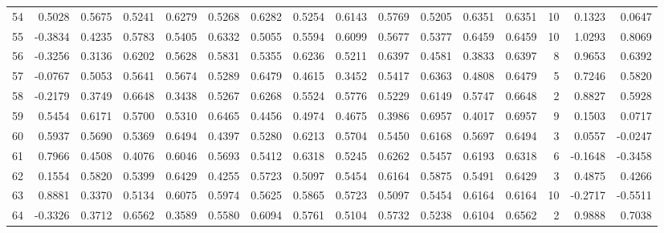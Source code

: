 \begin{tabular}{lrrrrrrrrrrrrrrr}
54  &      0.5028 &  0.5675 &  0.5241 &  0.6279 &  0.5268 &  0.6282 &  0.5254 &  0.6143 &  0.5769 &  0.5205 &   0.6351 &     0.6351 &     10 &                    0.1323 &                     0.0647 \\
55  &     -0.3834 &  0.4235 &  0.5783 &  0.5405 &  0.6332 &  0.5055 &  0.5594 &  0.6099 &  0.5677 &  0.5377 &   0.6459 &     0.6459 &     10 &                    1.0293 &                     0.8069 \\
56  &     -0.3256 &  0.3136 &  0.6202 &  0.5628 &  0.5831 &  0.5355 &  0.6236 &  0.5211 &  0.6397 &  0.4581 &   0.3833 &     0.6397 &      8 &                    0.9653 &                     0.6392 \\
57  &     -0.0767 &  0.5053 &  0.5641 &  0.5674 &  0.5289 &  0.6479 &  0.4615 &  0.3452 &  0.5417 &  0.6363 &   0.4808 &     0.6479 &      5 &                    0.7246 &                     0.5820 \\
58  &     -0.2179 &  0.3749 &  0.6648 &  0.3438 &  0.5267 &  0.6268 &  0.5524 &  0.5776 &  0.5229 &  0.6149 &   0.5747 &     0.6648 &      2 &                    0.8827 &                     0.5928 \\
59  &      0.5454 &  0.6171 &  0.5700 &  0.5310 &  0.6465 &  0.4456 &  0.4974 &  0.4675 &  0.3986 &  0.6957 &   0.4017 &     0.6957 &      9 &                    0.1503 &                     0.0717 \\
60  &      0.5937 &  0.5690 &  0.5369 &  0.6494 &  0.4397 &  0.5280 &  0.6213 &  0.5704 &  0.5450 &  0.6168 &   0.5697 &     0.6494 &      3 &                    0.0557 &                    -0.0247 \\
61  &      0.7966 &  0.4508 &  0.4076 &  0.6046 &  0.5693 &  0.5412 &  0.6318 &  0.5245 &  0.6262 &  0.5457 &   0.6193 &     0.6318 &      6 &                   -0.1648 &                    -0.3458 \\
62  &      0.1554 &  0.5820 &  0.5399 &  0.6429 &  0.4255 &  0.5723 &  0.5097 &  0.5454 &  0.6164 &  0.5875 &   0.5491 &     0.6429 &      3 &                    0.4875 &                     0.4266 \\
63  &      0.8881 &  0.3370 &  0.5134 &  0.6075 &  0.5974 &  0.5625 &  0.5865 &  0.5723 &  0.5097 &  0.5454 &   0.6164 &     0.6164 &     10 &                   -0.2717 &                    -0.5511 \\
64  &     -0.3326 &  0.3712 &  0.6562 &  0.3589 &  0.5580 &  0.6094 &  0.5761 &  0.5104 &  0.5732 &  0.5238 &   0.6104 &     0.6562 &      2 &                    0.9888 &                     0.7038 \\

\end{tabular}
